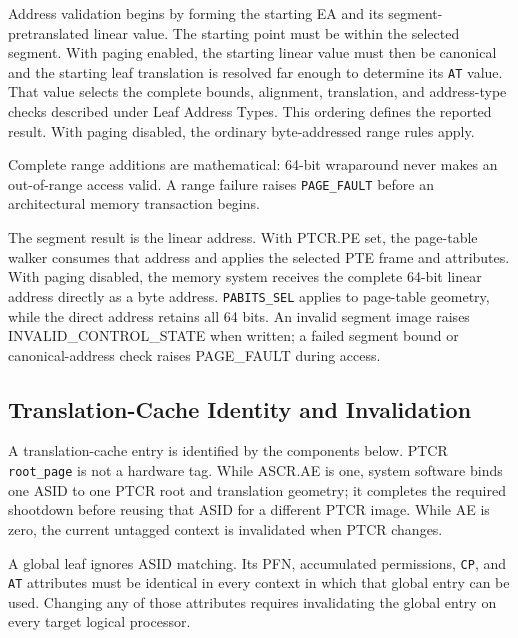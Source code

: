 Address validation begins by forming the starting EA and its segment-pretranslated linear value. The starting point
must be within the selected segment. With paging enabled, the starting linear value must then be canonical and the
starting leaf translation is resolved far enough to determine its \texttt{AT} value. That value selects the complete
bounds, alignment, translation, and address-type checks described under Leaf Address Types. This ordering defines
the reported result. With paging disabled, the ordinary byte-addressed range rules apply.

Complete range additions are mathematical: 64-bit wraparound never makes an out-of-range access valid. A range
failure raises \texttt{PAGE\_FAULT} before an architectural memory transaction begins.

The segment result is the linear address. With PTCR.PE set, the page-table walker consumes that address and applies
the selected PTE frame and attributes. With paging disabled, the memory system receives the complete 64-bit linear
address directly as a byte address. \texttt{PABITS\_SEL} applies to page-table geometry, while the direct address
retains all 64 bits. An invalid segment image raises INVALID\_CONTROL\_STATE when written; a failed segment bound or
canonical-address check raises PAGE\_FAULT during access.





\subsection{Translation-Cache Identity and Invalidation}
A translation-cache entry is identified by the components below. PTCR \texttt{root\_page} is not a hardware tag.
While ASCR.AE is one, system software binds one ASID to one PTCR root and translation geometry; it completes the
required shootdown before reusing that ASID for a different PTCR image. While AE is zero, the current untagged
context is invalidated when PTCR changes.



A global leaf ignores ASID matching. Its PFN, accumulated permissions, \texttt{CP}, and \texttt{AT} attributes must
be identical in every context in which that global entry can be used. Changing any of those attributes requires
invalidating the global entry on every target logical processor.

